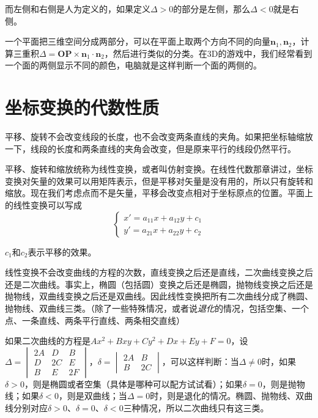 而左侧和右侧是人为定义的，如果定义$\Delta>0$的部分是左侧，那么$\Delta<0$就是右侧。

一个平面把三维空间分成两部分，可以在平面上取两个方向不同的向量$\mathbf{n}_1,\mathbf{n}_2$，计算三重积$\Delta=\mathbf{OP} \times \mathbf{n}_1 \cdot \mathbf{n}_2$，然后进行类似的分类。在3D的游戏中，我们经常看到一个面的两侧显示不同的颜色，电脑就是这样判断一个面的两侧的。
\section{坐标变换的代数性质}
平移、旋转不会改变线段的长度，也不会改变两条直线的夹角。如果把坐标轴缩放一下，线段的长度和两条直线的夹角会改变，但是原来平行的线段仍然平行。

平移、旋转和缩放统称为线性变换，或者叫仿射变换。在线性代数那章讲过，坐标变换对矢量的效果可以用矩阵表示，但是平移对矢量是没有用的，所以只有旋转和缩放。现在我们考虑点而不是矢量，平移会改变点相对于坐标原点的位置。平面上的线性变换可以写成
\begin{equation*}
\begin{cases}
x'=a_{1 1} x+a_{1 2} y+c_1 \\
y'=a_{2 1} x+a_{2 2} y+c_2
\end{cases}
\end{equation*}

$c_1$和$c_2$表示平移的效果。

线性变换不会改变曲线的方程的次数，直线变换之后还是直线，二次曲线变换之后还是二次曲线。事实上，椭圆（包括圆）变换之后还是椭圆，抛物线变换之后还是抛物线，双曲线变换之后还是双曲线。因此线性变换把所有二次曲线分成了椭圆、抛物线、双曲线三类。（除了一些特殊情况，或者说\emph{退化}的情况，包括空集、一个点、一条直线、两条平行直线、两条相交直线）

如果二次曲线的方程是$A x^2+B x y+C y^2+D x+E y+F=0$，设$\Delta=\begin{vmatrix}
2 A & D & B \\
D & 2 C & E \\
B & E & 2 F
\end{vmatrix}$，$\delta=\begin{vmatrix}
2 A & B \\
B & 2 C
\end{vmatrix}$，可以这样判断：当$\Delta \neq 0$时，如果$\delta>0$，则是椭圆或者空集（具体是哪种可以配方试试看）；如果$\delta=0$，则是抛物线；如果$\delta<0$，则是双曲线；当$\Delta=0$时，则是退化的情况。椭圆、抛物线、双曲线分别对应$\delta>0$、$\delta=0$、$\delta<0$三种情况，所以二次曲线只有这三类。

